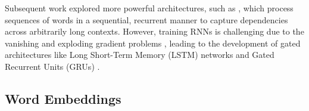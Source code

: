 Subsequent work explored more powerful architectures, such as  \citep{mikolov2010recurrent}, which process sequences of words in a sequential, recurrent manner to capture dependencies across arbitrarily long contexts. However, training RNNs is challenging due to the vanishing and exploding gradient problems \citep{bengio1994learning}, leading to the development of gated architectures like Long Short-Term Memory (LSTM) networks \citep{hochreiter1997lstm} and Gated Recurrent Units (GRUs) \citep{cho2014gru}.






\subsection{Word Embeddings}
\label{sec:word-embeddings}

